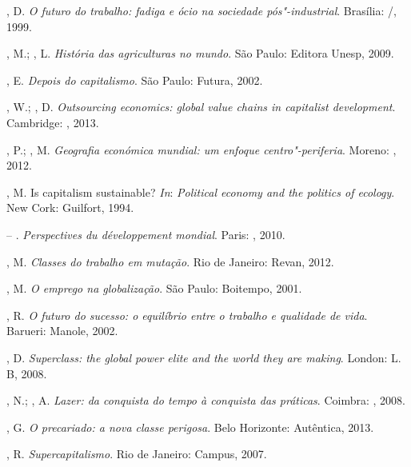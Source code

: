 \begin{Parskip}
, D. \emph{O futuro do trabalho: fadiga e ócio na sociedade
pós"-industrial}. Brasília: /, 1999.

, M.; , L. \emph{História das agriculturas no mundo}.
São Paulo: Editora Unesp, 2009.

, E. \emph{Depois do capitalismo}. São Paulo: Futura, 2002.

, W.; , D. \emph{Outsourcing economics: global value
chains in capitalist development}. Cambridge: , 2013.

, P.; , M. \emph{Geografia económica mundial: um
enfoque centro"-periferia}. Moreno: , 2012.

, M. Is capitalism sustainable? \emph{In}: \emph{Political
economy and the politics of ecology}. New Cork: Guilfort, 1994.

 -- .
\emph{Perspectives du développement mondial}. Paris: , 2010.

, M. \emph{Classes do trabalho em mutação}. Rio de Janeiro:
Revan, 2012.

, M. \emph{O emprego na globalização}. São Paulo: Boitempo,
2001.

, R. \emph{O futuro do sucesso: o equilíbrio entre o trabalho e
qualidade de vida}. Barueri: Manole, 2002.

, D. \emph{Superclass: the global power elite and the world
they are making}. London: L. B, 2008.

, N.; , A. \emph{Lazer: da conquista do tempo à conquista
das práticas}. Coimbra: , 2008.

, G. \emph{O precariado: a nova classe perigosa}. Belo
Horizonte: Autêntica, 2013.

, R. \emph{Supercapitalismo}. Rio de Janeiro: Campus, 2007.
\end{Parskip}